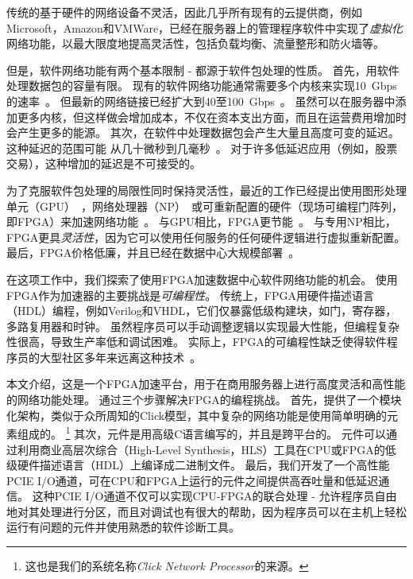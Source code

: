 传统的基于硬件的网络设备不灵活，因此几乎所有现有的云提供商，例如Microsoft，Amazon和VMWare，已经在服务器上的管理程序软件中实现了\textit{虚拟化}网络功能，以最大限度地提高灵活性，包括负载均衡、流量整形和防火墙等。

但是，软件网络功能有两个基本限制 - 都源于软件包处理的性质。
首先，用软件处理数据包的容量有限。
现有的软件网络功能通常需要多个内核来实现10~Gbps的速率~\cite{comb,martins2014clickos}。
但最新的网络链接已经扩大到40至100~Gbps~\cite{mellanox-100g}。
虽然可以在服务器中添加更多内核，但这样做会增加成本，不仅在资本支出方面，而且在运营费用增加时会产生更多的能源。
%
其次，在软件中处理数据包会产生大量且高度可变的延迟。 这种延迟的范围可能
从几十微秒到几毫秒~\cite{martins2014clickos,ananta,duet}。
对于许多低延迟应用（例如，股票交易），这种增加的延迟是不可接受的。

为了克服软件包处理的局限性同时保持灵活性，最近的工作已经提出使用图形处理单元（GPU）~\cite{packetshader}，网络处理器（NP）~\cite {cavium,netronome}或可重新配置的硬件（现场可编程门阵列，即FPGA）来加速网络功能~\cite{netfpga,smartnic,rubow2010chimpp}。
与GPU相比，FPGA更节能~\cite {fpga-vs-gpu,fpga-vs-gpu2}。
与专用NP相比，FPGA更具\emph{灵活性}，因为它可以使用任何服务的任何硬件逻辑进行虚拟重新配置。
最后，FPGA价格低廉，并且已经在数据中心大规模部署~\cite {smartnic,putnam2014reconfigurable}。

在这项工作中，我们探索了使用FPGA加速数据中心软件网络功能的机会。
使用FPGA作为加速器的主要挑战是\textit{可编程性}。
传统上，FPGA用硬件描述语言（HDL）编程，例如Verilog和VHDL，它们仅暴露低级构建块，如门，寄存器，多路复用器和时钟。
虽然程序员可以手动调整逻辑以实现最大性能，但编程复杂性很高，导致生产率低和调试困难。
实际上，FPGA的可编程性缺乏使得软件程序员的大型社区多年来远离这种技术~\cite{bacon2013fpga}。

本文介绍\name{}，这是一个FPGA加速平台，用于在商用服务器上进行高度灵活和高性能的网络功能处理。
\name{}通过三个步骤解决FPGA的编程挑战。
首先，提供了一个模块化架构，类似于众所周知的Click模型\cite {kohler2000click}，其中复杂的网络功能是使用简单明确的元素组成的。
\footnote{这也是我们的系统名称\textit{Click Network Processor}的来源。}
其次，\name 元件是用高级C语言编写的，并且是跨平台的。
\name 元件可以通过利用商业高层次综合（High-Level Synthesis，HLS）工具\cite {vivado,aoc,sdaccel}在CPU或FPGA的低级硬件描述语言（HDL）上编译成二进制文件。
最后，我们开发了一个高性能PCIE I/O通道，可在CPU和FPGA上运行的元件之间提供高吞吐量和低延迟通信。
这种PCIE I/O通道不仅可以实现CPU-FPGA的联合处理 - 允许程序员自由地对其处理进行分区，而且对调试也有很大的帮助，因为程序员可以在主机上轻松运行有问题的元件并使用熟悉的软件诊断工具。

